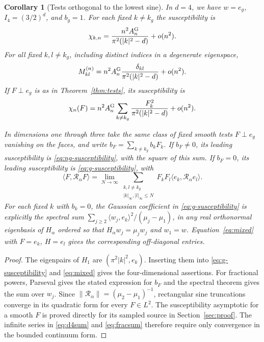 \documentclass[11pt]{article}
\numberwithin{equation}{section}
\newtheorem{corollary}[theorem]{Corollary}
\newcommand{\ip}[2]{\langle #1,#2\rangle}
\newcommand{\Ga}{\mathcal R_\alpha}
\begin{document}
\begin{corollary}[Tests orthogonal to the lowest sine]\label{cor:complement}
In $d=4$, we have $w=e_g$, $I_4=(3/2)^d$, and $b_g=1$. For each fixed
$k\ne k_g$ the susceptibility is
\begin{equation}
 \chi_{k,n}=\frac{n^2 A_n^{\rm G}}
                   {\pi^2(|k|^2-d)}+o(n^2).
\end{equation}
For all fixed $k,l\ne k_g$, including distinct indices in a degenerate
eigenspace,
\begin{equation}
 M^{(n)}_{kl}=n^2 A_n^{\rm G}
       \frac{\delta_{kl}}{\pi^2(|k|^2-d)}+o(n^2).
\end{equation}
If $F\perp e_g$ is as in Theorem~\ref{thm:tests}, its susceptibility is
\begin{equation}
 \chi_n(F)=n^2 A_n^{\rm G}
       \sum_{k\ne k_g}\frac{F_k^2}{\pi^2(|k|^2-d)}+o(n^2).
 \label{eq:d4sum}
\end{equation}

In dimensions one through three take the same class of fixed smooth
tests $F\perp e_g$ vanishing on the faces, and write
$b_F=\sum_{k\ne k_g} b_k F_k$. If $b_F\ne0$, its leading
susceptibility is \eqref{eq:ng-susceptibility}, with the square of this sum.
If $b_F=0$, its leading susceptibility is \eqref{eq:g-susceptibility}, with
\begin{equation}
 \ip{F}{\Ga F}=\lim_{N\to\infty}
 \sum_{\substack{k,l\ne k_g\\ |k|_\infty,|l|_\infty\le N}}
      F_k F_l\ip{e_k}{\Ga e_l}.
 \label{eq:fracsum}
\end{equation}
For each fixed $k$ with $b_k=0$, the Gaussian coefficient in
\eqref{eq:g-susceptibility} is explicitly the spectral sum
$\sum_{j\ge2}\ip{w_j}{e_k}^2/(\mu_j-\mu_1)$, in any real orthonormal
eigenbasis of $H_\alpha$ ordered so that $H_\alpha w_j=\mu_jw_j$
and $w_1=w$. Equation~\eqref{eq:mixed}
with $F=e_k$, $H=e_l$ gives the corresponding off-diagonal entries.
\end{corollary}

\begin{proof}
The eigenpairs of $H_1$ are $(\pi^2|k|^2,e_k)$. Inserting them into
\eqref{eq:g-susceptibility} and \eqref{eq:mixed} gives the four-dimensional
assertions. For fractional powers, Parseval gives the stated expression
for $b_F$ and the spectral theorem gives the sum over $w_j$. Since
$\|\Ga\|=(\mu_2-\mu_1)^{-1}$, rectangular sine truncations converge
in its quadratic form for every $F\in L^2$. The susceptibility
asymptotic for a smooth $F$ is proved directly for its sampled source
in Section~\ref{sec:proof}. The infinite series in \eqref{eq:d4sum}
and \eqref{eq:fracsum} therefore require only convergence in the
bounded continuum form.
\end{proof}
\end{document}
